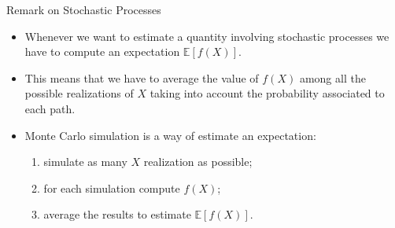\documentclass{beamer}
\begin{document}
\begin{frame}{Remark on Stochastic Processes}
\begin{itemize}
\item Whenever we want to estimate a quantity involving stochastic processes we have to compute an expectation $\mathbb{E}[f(X)]$.
\item This means that we have to average the value of $f(X)$ among all the possible realizations of $X$ taking into account the probability associated to each path.
\item Monte Carlo simulation is a way of estimate an expectation: 
\begin{enumerate}
\item simulate as many $X$ realization as possible;
\item for each simulation compute $f(X)$;
\item average the results to estimate $\mathbb{E}[f(X)]$.
\end{enumerate}
\end{itemize}
\end{frame}
\end{document}
